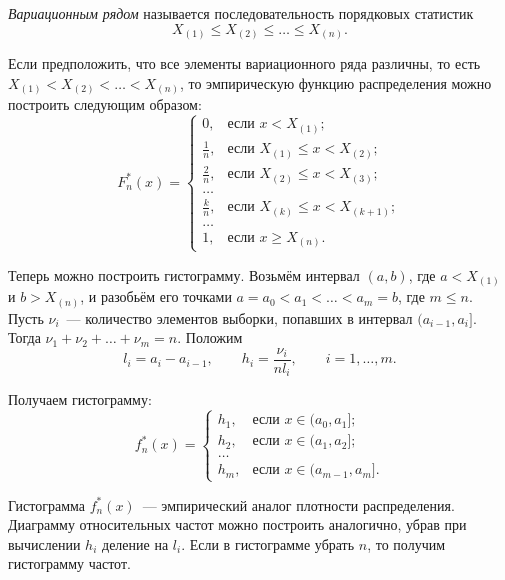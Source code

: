 \begin{definition}
  \emph{Вариационным рядом} называется последовательность порядковых статистик
  \[
    X_{(1)} \le X_{(2)} \le \ldots \le X_{(n)}.
  \]
\end{definition}

Если предположить, что все элементы вариационного ряда различны,
то есть $X_{(1)} < X_{(2)} < \ldots < X_{(n)}$, то эмпирическую
функцию распределения можно построить следующим образом:
\begin{equation}
  \label{eq:ecdf}
  F_n^*(x) =
  \begin{cases}
    0,           & \text{если } x < X_{(1)}; \\
    \frac{1}{n}, & \text{если } X_{(1)} \le x < X_{(2)}; \\
    \frac{2}{n}, & \text{если } X_{(2)} \le x < X_{(3)}; \\
    \ldots \\
    \frac{k}{n}, & \text{если } X_{(k)} \le x < X_{(k+1)}; \\
    \ldots \\
    1,           & \text{если } x \ge X_{(n)}.
  \end{cases}
\end{equation}

Теперь можно построить гистограмму. Возьмём интервал $(a, b)$, где $a < X_{(1)}$ и $b > X_{(n)}$,
и разобьём его точками
$a = a_0 < a_1 < \ldots < a_m = b$, где $m \le n$.
Пусть $\nu_i$~--- количество элементов выборки, попавших в интервал $(a_{i-1}, a_{i}]$.
Тогда $\nu_1 + \nu_2 + \ldots + \nu_m = n$. Положим
\[
  l_i = a_i - a_{i-1}, \qquad h_i = \frac{\nu_i}{n l_i}, \qquad i = 1, \ldots, m.
\]

Получаем гистограмму:
\begin{equation}
  \label{eq:histogram}
  f_n^{*}(x) =
  \begin{cases}
    h_1, & \text{если } x \in (a_0, a_1]; \\
    h_2, & \text{если } x \in (a_1, a_2]; \\
    \ldots \\
    h_m, & \text{если } x \in (a_{m-1}, a_m].
  \end{cases}
\end{equation}

Гистограмма $f_n^{*}(x)$~--- эмпирический аналог плотности распределения. Диаграмму
относительных частот можно построить аналогично, убрав при вычислении $h_i$ деление на $l_i$.
Если в гистограмме убрать $n$, то получим гистограмму частот.
